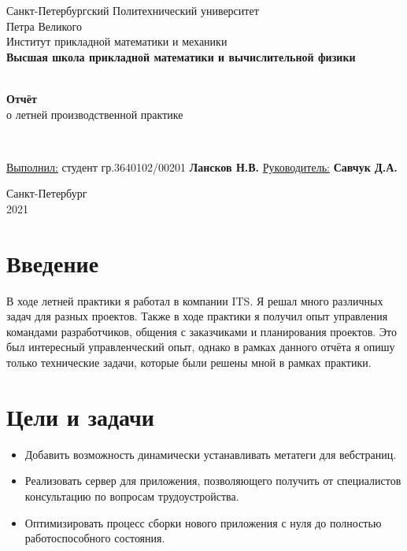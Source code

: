 \documentclass[a4papaer,12pt]{article}
\begin{document}
\begin{titlepage}
	\center
		Санкт-Петербургский Политехнический
		университет \\ Петра Великого\\
		Институт прикладной математики и механики
		\\ \textbf{Высшая школа прикладной математики и вычислительной физики}

	\vfill ~
	\textbf{
		\\ \large Отчёт
	}
    \\ о летней производственной практике 

	\vfill ~

    \begin{flushleft}
    \underline{Выполнил:}  \hspace{\fill} студент гр.3640102/00201 \textbf{Лансков Н.В.} \linebreak[2]
	\underline{Руководитель:} \hspace{\fill} \textbf{Савчук Д.А.} \\
    \end{flushleft}

\vfill

{\large}	Санкт-Петербург
\\ 2021
\end{titlepage}

\tableofcontents
\newpage

\section{Введение}
В ходе летней практики я работал в компании ITS\cite{its}. Я решал много различных задач для разных проектов. Также 
в ходе практики я получил опыт управления командами разработчиков, общения с заказчиками и планирования проектов.
Это был интересный управленческий опыт, однако в рамках данного отчёта я опишу только технические задачи, 
которые были решены мной в рамках практики.

\section{Цели и задачи}

\begin{itemize}
    \item Добавить возможность динамически устанавливать метатеги для вебстраниц.
    \item Реализовать сервер для приложения, позволяющего получить от специалистов консультацию по вопросам трудоустройства.
    \item Оптимизировать процесс сборки нового приложения с нуля до полностью работоспособного состояния.
\end{itemize}
\end{document}
